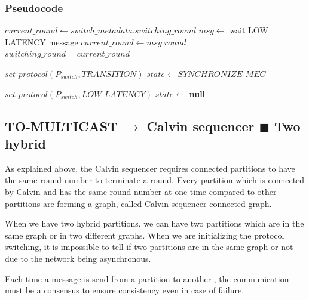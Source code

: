 \documentclass[a4paper, 10pt]{article}
\newcommand{\Li}[1]{\mynote{Li}{#1}{blue}}
\begin{document}
\subsubsection{Pseudocode}

\begin{algorithmic}[1]
     \label{alg:line:calvin_1:round}
            \State $current\_round \gets switch\_metadata.switching\_round$
            \State $msg \gets$ wait LOW LATENCY message
            \State $current\_round \gets msg.round$
        \EndIf
        \State $switching\_round = current\_round$

        \State $set\_protocol(P_{switch}, TRANSITION)$
        \State $state \gets SYNCHRONIZE\_MEC$
    \EndUpon \label{alg:line:calvin_1:round:end}

     \label{alg:line:calvin_1:switch}
        \State $set\_protocol(P_{switch}, LOW\_LATENCY)$
        \State $state \gets$ \textbf{null} \label{alg:line:calvin_1:switch:end}
    \EndUpon
\end{algorithmic}

\subsection{TO-MULTICAST $\rightarrow$ Calvin sequencer {\tiny$\blacksquare$} Two hybrid}

As explained above, the Calvin sequencer requires connected partitions to have the same round number to
terminate a round. Every partition which is connected by Calvin and has the same round number at one time
compared to other partitions are forming a graph, called Calvin sequencer connected graph.

When we have two hybrid partitions, we can have two partitions which are in the same graph or in two
different graphs. When we are initializing the protocol switching, it is impossible to tell if
two partitions are in the same graph or not due to the network being asynchronous.

Each time a message is send from a partition to another \Li{what kind of message?}, the communication must be a consensus to ensure
consistency even in case of failure.
\end{document}
